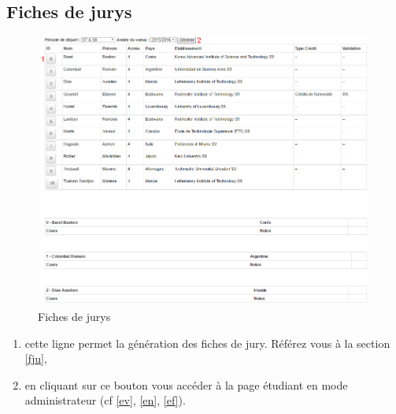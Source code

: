     \subsection{Fiches de jurys}
    \label{fj}
    \begin{figure}[H]
    	\centering
    	\includegraphics[width=16cm,height=9cm]{Images/Admin/fiche_jury_admin.png}
    	\caption{Fiches de jurys}
    	
    \end{figure}
    \begin{enumerate}
    \item cette ligne permet la génération des fiches de jury. Référez vous à la section \ref{fju},
    \item en cliquant sur ce bouton vous accéder à la page étudiant en mode administrateur (cf \ref{ev}, \ref{en}, \ref{ef}).
    \end{enumerate}
    
    
      
